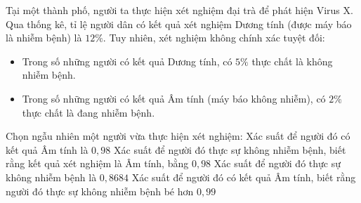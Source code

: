 \begin{ex}%
	Tại một thành phố, người ta thực hiện xét nghiệm đại trà để phát hiện Virus X. Qua thống kê, tỉ lệ người dân có kết quả xét nghiệm Dương tính (được máy báo là nhiễm bệnh) là $12\%$. Tuy nhiên, xét nghiệm không chính xác tuyệt đối:
	\begin{itemize}
		\item Trong số những người có kết quả Dương tính, có $5\%$ thực chất là không nhiễm bệnh.
		\item Trong số những người có kết quả Âm tính (máy báo không nhiễm), có $2\%$ thực chất là đang nhiễm bệnh.
	\end{itemize}
	Chọn ngẫu nhiên một người vừa thực hiện xét nghiệm:
	\choiceTF
	{Xác suất để người đó có kết quả Âm tính là $0{,}98$}
	{\True Xác suất để người đó thực sự không nhiễm bệnh, biết rằng kết quả xét nghiệm là Âm tính, bằng $0{,}98$}
	{\True Xác suất để người đó thực sự không nhiễm bệnh là $0{,}8684$}
	{Xác suất để người đó có kết quả Âm tính, biết rằng người đó thực sự không nhiễm bệnh bé hơn $0{,}99$}
\end{ex}
